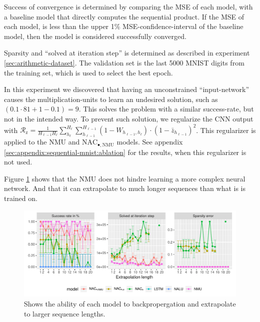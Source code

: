 Success of convergence is determined by comparing the MSE of each model, with a baseline model that directly computes the sequential product. If the MSE of each model, is less than the upper 1\% MSE-confidence-interval of the baseline model, then the model is considered successfully converged.

Sparsity and ``solved at iteration step'' is determined as described in experiment \ref{sec:arithmetic-dataset}. The validation set is the last 5000 MNIST digits from the training set, which is used to select the best epoch.

In this experiment we discovered that having an unconstrained ``input-network'' causes the multiplication-units to learn an undesired solution, such as $(0.1 \cdot 81 + 1 - 0.1) = 9$. This solves the problem with a similar success-rate, but not in the intended way. To prevent such solution, we regularize the CNN output with $\mathcal{R}_{\mathrm{z}} = \frac{1}{H_{\ell-1} H_\ell} \sum_{h_\ell}^{H_\ell} \sum_{h_{\ell-1}}^{H_{\ell-1}} (1 - W_{h_{\ell-1},h_\ell}) \cdot (1 - \bar{z}_{h_{\ell-1}})^2$. This regularizer is applied to the NMU and $\mathrm{NAC}_{\bullet,\mathrm{NMU}}$ models. See appendix \ref{sec:appendix:sequential-mnist:ablation} for the results, when this regularizer is not used.

Figure \ref{fig:sequential-mnist-prod-results} shows that the NMU does not hindre learning a more complex neural network. And that it can extrapolate to much longer sequences than what is is trained on.

\begin{figure}[h]
\centering
\includegraphics[width=\linewidth,trim={0 0.5cm 0 0},clip]{results/sequential_mnist_prod_long.pdf}
\caption{Shows the ability of each model to backpropergation and extrapolate to larger sequence lengths.} 
\label{fig:sequential-mnist-prod-results}
\end{figure}
